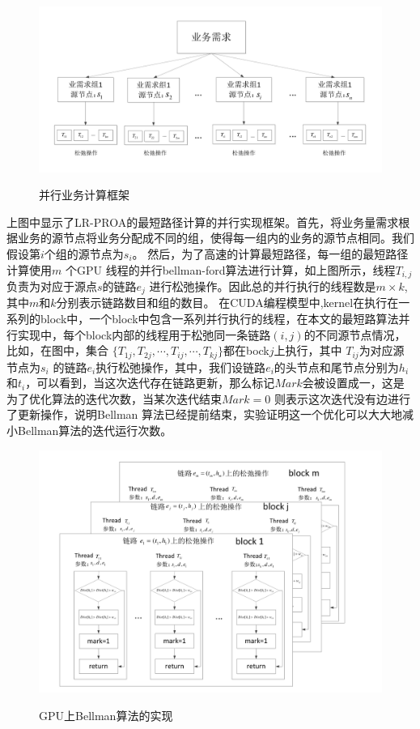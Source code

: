 \begin{figure}
\setlength{\belowcaptionskip}{-0.5cm}
  \begin{center}
    {\includegraphics[width=1 \textwidth]{figures/paframework.pdf}}
    \end{center}
  \caption{{\footnotesize{并行业务计算框架}}}
  \label{ParFramework}
\end{figure}
  上图中显示了LR-PROA的最短路径计算的并行实现框架。首先，将业务量需求根据业务的源节点将业务分配成不同的组，使得每一组内的业务的源节点相同。我们假设第$i$个组的源节点为$s_i$。 然后，为了高速的计算最短路径，每一组的最短路径计算使用$m$ 个GPU 线程的并行bellman-ford算法进行计算，如上图所示，线程$T_{i,j}$负责为对应于源点$s$的链路$e_{j}$ 进行松弛操作。因此总的并行执行的线程数是$m \times k$,其中$m$和$k$分别表示链路数目和组的数目。
  在CUDA编程模型中,kernel在执行在一系列的block中，一个block中包含一系列并行执行的线程，在本文的最短路算法并行实现中，每个block内部的线程用于松弛同一条链路$(i,j)$的不同源节点情况，比如，在图中，集合
$\{T_{1j}, T_{2j}, \cdots, T_{ij}, \cdots, T_{kj}\}$都在bock$j$上执行，其中 $T_{ij}$为对应源节点为$s_i$ 的链路$e_i$执行松弛操作，其中，我们设链路$e_i$的头节点和尾节点分别为$h_i$ 和$t_i$，可以看到，当这次迭代存在链路更新，那么标记$Mark$会被设置成一，这是为了优化算法的迭代次数，当某次迭代结束$Mark=0$ 则表示这次迭代没有边进行了更新操作，说明Bellman 算法已经提前结束，实验证明这一个优化可以大大地减小Bellman算法的迭代运行次数。
\begin{figure}
\setlength{\belowcaptionskip}{-0.5cm}
  \begin{center}
    {\includegraphics[width=1 \textwidth]{figures/GPUimpl.pdf}}
    \end{center}
  \caption{{\footnotesize{GPU上Bellman算法的实现}}}
  \label{ParFramework}
\end{figure}

